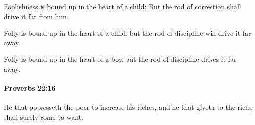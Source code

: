			\begin{versebox}
					\item[BHS] 
					\item[ASV] Foolishness is bound up in the heart of a child; But the rod of correction shall drive it far from him.
					\item[NIV] Folly is bound up in the heart of a child, but the rod of discipline will drive it far away.
					\item[NRSV] Folly is bound up in the heart of a boy, but the rod of discipline drives it far away.
			\end{versebox}

		\paragraph{Proverbs 22:16} %
			\label{PROVERBS-22-16}

			He that oppresseth the poor to increase his riches, and he that giveth to the rich, shall surely come to want.

